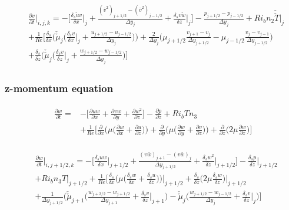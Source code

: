 \documentclass[preprint,12pt]{article}
\begin{document}
\begin{align}	\begin{split}
&\frac{\partial v}{\partial t}\Bigg|_{i,j,k}=-\Bigg[\frac{\delta_s \check{u}v}{\delta x}\Bigg|_{j}+\frac{(\bar{v}^2)_{j+1/2}-(\bar{v}^2)_{j-1/2}}{\Delta y_{j}}+\frac{\delta_s v\check{w}}{\delta z}\Bigg|_{j}\Bigg]-\frac{p_{j+1/2}-p_{j-1/2}}{\Delta y_j}+Ri_bn_2\check{\check{T}}|_{j} \\&+\frac{1}{Re}\Bigg[\frac{\delta_s}{\delta x}\Big(\check{\check{\mu}}_j\Big(\frac{\delta_s v}{\delta x}\Big|_j+\frac{u_{j+1/2}-u_{j-1/2}}{\Delta y_j}\Big)\Big)+\frac{2}{\Delta y_j}\Big(\mu_{j+1/2}\frac{v_{j+1}-v_j}{\Delta y_{j+1/2}}-\mu_{j-1/2}\frac{v_{j}-v_{j-1}}{\Delta y_{j-1/2}} \Big)\\&+\frac{\delta_s }{\delta z}\Big(\check{\check{\mu}}_j\Big(\frac{\delta_s v}{\delta z}\Big|_j+\frac{w_{j+1/2}-w_{j-1/2}}{\Delta y_j}\Big)\Bigg] 
\end{split}	\end{align} 

\subsubsection{z-momentum equation}
\begin{align}	\begin{split}
\frac{\partial w}{\partial t}=&-\Bigg[\frac{\partial uw}{\partial x}+\frac{\partial vw}{\partial y}+\frac{\partial w^2}{\partial z}\Bigg]-\frac{\partial p}{\partial z}+Ri_bT n_3\\&+\frac{1}{Re}\Bigg[\frac{\partial }{\partial x}\Bigg(\mu\Big(\frac{\partial w}{\partial x}+\frac{\partial u}{\partial z}\Big)\Bigg)+\frac{\partial }{\partial y}\Bigg(\mu\Big(\frac{\partial w}{\partial y}+\frac{\partial v}{\partial z}\Big)\Bigg)+\frac{\partial }{\partial z}\Bigg(2\mu\frac{\partial w}{\partial z}\Bigg)\Bigg]
\end{split}	\end{align}

\begin{align}	\begin{split}
&\frac{\partial w}{\partial t}\Bigg|_{i,j+1/2,k}=-\Bigg[\frac{\delta_s uw}{\delta x}\Bigg|_{j+1/2}+\frac{(v\bar{w})_{j+1}-(v\bar{w})_{j}}{\Delta y_{j+1/2}}+\frac{\delta_s 
	w^2}{\delta z}\Bigg|_{j+1/2}\Bigg]-\frac{\delta_s p}{\delta z}\Bigg|_{j+1/2}\\&+Ri_bn_3T|_{j+1/2} +\frac{1}{Re}\Bigg[\frac{\delta_s }{\delta x}\Bigg(\mu\Big(\frac{\delta_s w}{\delta x}+\frac{\delta_s u}{\delta z}\Big)\Bigg)\Bigg|_{j+1/2}+\frac{\delta_s }{\delta z}\Big(2\mu\frac{\delta_s w}{\delta z}\Big)\Bigg|_{j+1/2}\\&+\frac{1}{\Delta y_{j+1/2}}\Bigg(\check{\check{\mu}}_{j+1}\Bigg(\frac{w_{j+3/2}-w_{j+1/2}}{\Delta y_{j+1}}+\frac{\delta_s v}{\delta z}\Bigg|_{j+1}\Bigg)-\check{\check{\mu}}_{j}\Bigg(\frac{w_{j+1/2}-w_{j-1/2}}{\Delta y_{j}}+\frac{\delta_s v}{\delta z}\Bigg|_{j}\Bigg)\Bigg] 
\end{split}	\end{align} 
\end{document}
